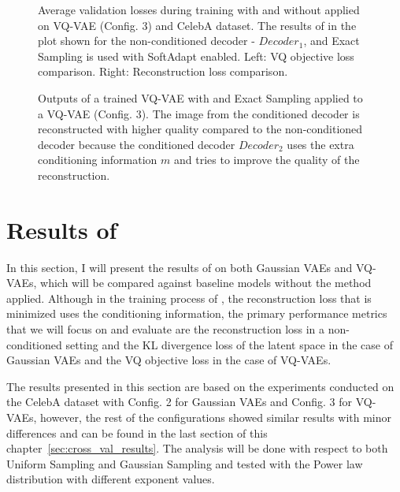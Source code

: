 \begin{figure}[H]
    \centering
    \scalebox{0.48}{}
    \scalebox{0.48}{}
    \caption[Validation loss comparison during training of a Gaussian VAE.]
    {
        Average validation losses during training with and without  applied on VQ-VAE (Config. 3) and CelebA dataset. The results of  in the plot shown for the non-conditioned decoder - $Decoder_1$, and Exact Sampling is used with SoftAdapt enabled.
        Left: VQ objective loss comparison. Right: Reconstruction loss comparison.
    }
    \label{fig:results_method1_vq_vae}
\end{figure}

\begin{figure}[H]
    \centering
    
    \caption[Trained neural network with  applied to a VQ-VAE.]
    {
        Outputs of a trained VQ-VAE with  and Exact Sampling applied to a VQ-VAE (Config. 3). The image from the conditioned decoder is reconstructed with higher quality compared to the non-conditioned decoder because the conditioned decoder $Decoder_2$ uses the extra conditioning information $m$ and tries to improve the quality of the reconstruction.
    }
    \label{fig:rec_vqvae}
\end{figure}


\section{Results of }

In this section, I will present the results of  on both Gaussian VAEs and VQ-VAEs, which will be compared against baseline models without the method applied. Although in the training process of , the reconstruction loss that is minimized uses the conditioning information, the primary performance metrics that we will focus on and evaluate are the reconstruction loss in a non-conditioned setting and the KL divergence loss of the latent space in the case of Gaussian VAEs and the VQ objective loss in the case of VQ-VAEs.

The results presented in this section are based on the experiments conducted on the CelebA dataset with Config. 2 for Gaussian VAEs and Config. 3 for VQ-VAEs, however, the rest of the configurations showed similar results with minor differences and can be found in the last section of this chapter~\ref{sec:cross_val_results}. The analysis will be done with respect to both Uniform Sampling and Gaussian Sampling and tested with the Power law distribution with different exponent values.


